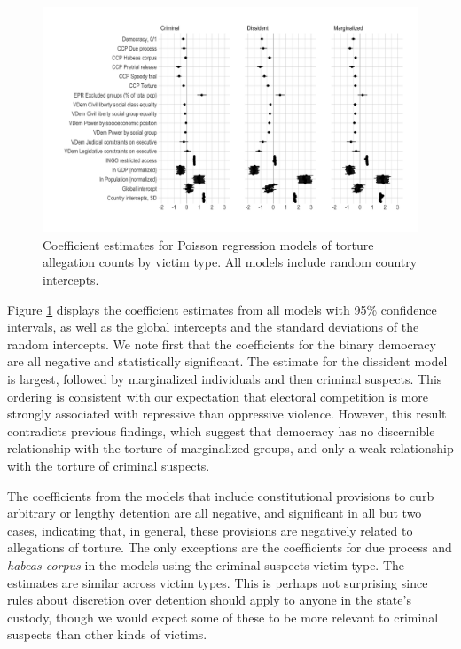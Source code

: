 \documentclass[11pt]{article}
\begin{document}
\begin{figure}
\begin{center}
\caption{Coefficient estimates for Poisson regression models of torture allegation counts by victim type. All models include random country intercepts.}
\label{fig:coefs}
\includegraphics[width=.99\textwidth]{../output/figures/model-coefs.png}
\end{center}
\end{figure}

Figure \ref{fig:coefs} displays the coefficient estimates from all models with 95\% confidence intervals, as well as the global intercepts and the standard deviations of the random intercepts. We note first that the coefficients for the binary democracy are all negative and statistically significant. The estimate for the dissident model is largest, followed by marginalized individuals and then criminal suspects. This ordering is consistent with our expectation that electoral competition is more strongly associated with repressive than oppressive violence. However, this result contradicts previous findings, which suggest that democracy has no discernible relationship with the torture of marginalized groups, and only a weak relationship with the torture of criminal suspects.  

The coefficients from the models that include constitutional provisions to curb arbitrary or lengthy detention are all negative, and significant in all but two cases, indicating that, in general, these provisions are negatively related to allegations of torture. The only exceptions are the coefficients for due process and {\em habeas corpus} in the models using the criminal suspects victim type. The estimates are similar across victim types. This is perhaps not surprising since rules about discretion over detention should apply to anyone in the state's custody, though we would expect some of these to be more relevant to criminal suspects than other kinds of victims.      
\end{document}
